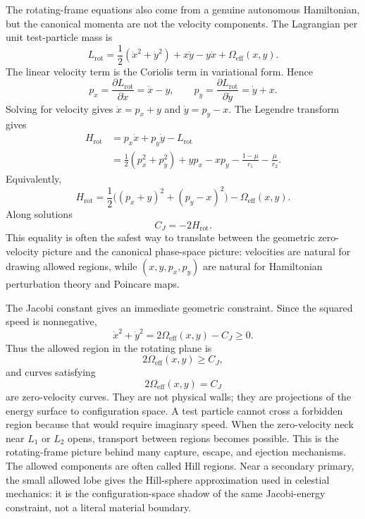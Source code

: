\begin{derivation}
The rotating-frame equations also come from a genuine autonomous Hamiltonian,
but the canonical momenta are not the velocity components.  The Lagrangian per
unit test-particle mass is
\[
  L_{\mathrm{rot}}
  =
  \frac12(\dot x^2+\dot y^2)
  +x\dot y-y\dot x
  +\Omega_{\mathrm{eff}}(x,y).
\]
The linear velocity term is the Coriolis term in variational form.  Hence
\[
  p_x=\frac{\partial L_{\mathrm{rot}}}{\partial\dot x}=\dot x-y,
  \qquad
  p_y=\frac{\partial L_{\mathrm{rot}}}{\partial\dot y}=\dot y+x.
\]
Solving for velocity gives \(\dot x=p_x+y\) and \(\dot y=p_y-x\).  The
Legendre transform gives
\[
\begin{aligned}
  H_{\mathrm{rot}}
  &=
  p_x\dot x+p_y\dot y-L_{\mathrm{rot}}\\
  &=
  \frac12(p_x^2+p_y^2)+yp_x-xp_y
  -\frac{1-\mu}{r_1}-\frac{\mu}{r_2}.
\end{aligned}
\]
Equivalently,
\[
  H_{\mathrm{rot}}
  =
  \frac12\big((p_x+y)^2+(p_y-x)^2\big)
  -\Omega_{\mathrm{eff}}(x,y).
\]
Along solutions
\[
  C_J=-2H_{\mathrm{rot}}.
\]
This equality is often the safest way to translate between the geometric
zero-velocity picture and the canonical phase-space picture: velocities are
natural for drawing allowed regions, while \((x,y,p_x,p_y)\) are natural for
Hamiltonian perturbation theory and Poincare maps.
\end{derivation}

The Jacobi constant gives an immediate geometric constraint. Since the squared
speed is nonnegative,
\[
  \dot x^2+\dot y^2
  =
  2\Omega_{\mathrm{eff}}(x,y)-C_J
  \geq0.
\]
Thus the allowed region in the rotating plane is
\[
  2\Omega_{\mathrm{eff}}(x,y)\geq C_J,
\]
and curves satisfying
\[
  2\Omega_{\mathrm{eff}}(x,y)=C_J
\]
are zero-velocity curves. They are not physical walls; they are projections of
the energy surface to configuration space. A test particle cannot cross a
forbidden region because that would require imaginary speed. When the
zero-velocity neck near \(L_1\) or \(L_2\) opens, transport between regions
becomes possible. This is the rotating-frame picture behind many capture,
escape, and ejection mechanisms.
The allowed components are often called Hill regions. Near a secondary primary,
the small allowed lobe gives the Hill-sphere approximation used in celestial
mechanics: it is the configuration-space shadow of the same Jacobi-energy
constraint, not a literal material boundary.


